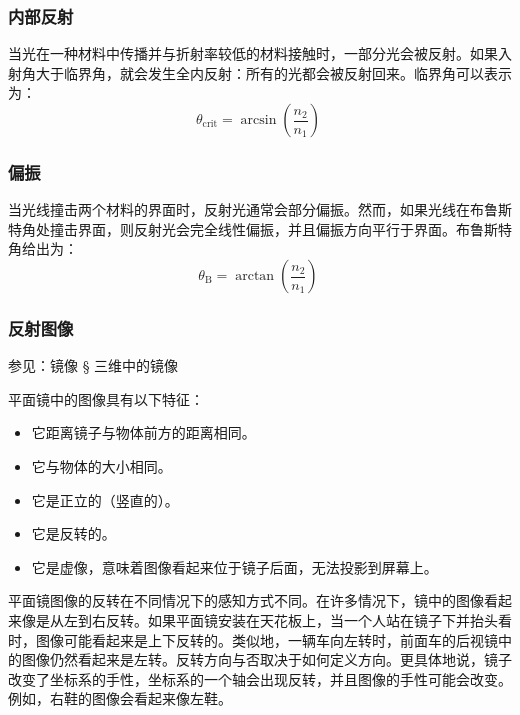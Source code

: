 \subsubsection{内部反射}

当光在一种材料中传播并与折射率较低的材料接触时，一部分光会被反射。如果入射角大于临界角，就会发生全内反射：所有的光都会被反射回来。临界角可以表示为：
\[
\theta_{\text{crit}} = \arcsin \left(\frac{n_2}{n_1}\right)~
\]
\subsubsection{偏振}
当光线撞击两个材料的界面时，反射光通常会部分偏振。然而，如果光线在布鲁斯特角处撞击界面，则反射光会完全线性偏振，并且偏振方向平行于界面。布鲁斯特角给出为：
\[
\theta_{\mathrm{B}} = \arctan \left(\frac{n_2}{n_1}\right)~
\]
\subsubsection{反射图像}

参见：镜像 § 三维中的镜像

平面镜中的图像具有以下特征：
\begin{itemize}
\item 它距离镜子与物体前方的距离相同。
\item 它与物体的大小相同。
\item 它是正立的（竖直的）。
\item 它是反转的。
\item 它是虚像，意味着图像看起来位于镜子后面，无法投影到屏幕上。
\end{itemize}
平面镜图像的反转在不同情况下的感知方式不同。在许多情况下，镜中的图像看起来像是从左到右反转。如果平面镜安装在天花板上，当一个人站在镜子下并抬头看时，图像可能看起来是上下反转的。类似地，一辆车向左转时，前面车的后视镜中的图像仍然看起来是左转。反转方向与否取决于如何定义方向。更具体地说，镜子改变了坐标系的手性，坐标系的一个轴会出现反转，并且图像的手性可能会改变。例如，右鞋的图像会看起来像左鞋。